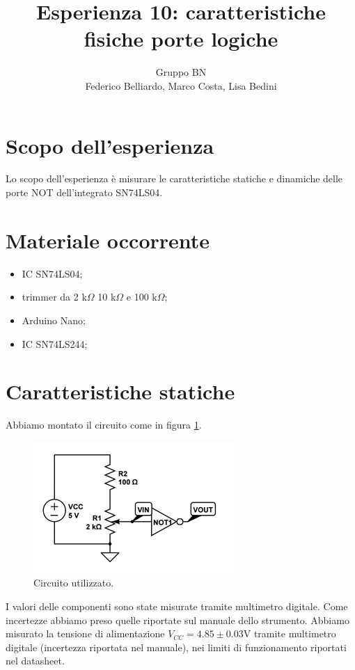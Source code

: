 \documentclass[10pt,a4paper]{article}
\author{Gruppo BN \\ Federico Belliardo, Marco Costa, Lisa Bedini}
\title{Esperienza 10: caratteristiche fisiche porte logiche}
\begin{document}
\maketitle

\section{Scopo dell'esperienza}
Lo scopo dell'esperienza è misurare le caratteristiche statiche e dinamiche delle porte NOT dell'integrato SN74LS04.

\section{Materiale occorrente}
\begin{itemize}
\item IC SN74LS04;
\item trimmer da 2 k$\Omega$ 10 k$\Omega$ e 100 k$\Omega$;
\item Arduino Nano;
\item IC SN74LS244;
\end{itemize}

\section{Caratteristiche statiche}
Abbiamo montato il circuito come in figura \ref{fig:circuito}.
\begin{figure}[!htb]
\centering
\includegraphics[scale=0.7]{circuito.png}
\caption{Circuito utilizzato.\label{fig:circuito}}
\end{figure}
I valori delle componenti sono state misurate tramite multimetro digitale. Come incertezze abbiamo preso quelle riportate sul manuale dello strumento.
Abbiamo misurato la tensione di alimentazione $V_{CC}=4.85\pm 0.03$V tramite multimetro digitale (incertezza riportata nel manuale), nei limiti di funzionamento riportati nel datasheet.
\end{document}

